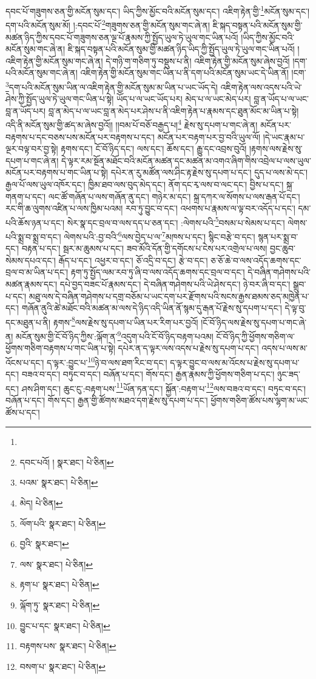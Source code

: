 དབང་པོ་གཟུགས་ཅན་གྱི་མངོན་སུམ་དང་། ཡིད་ཀྱིས་མྱོང་བའི་མངོན་སུམ་དང་། འཇིག་རྟེན་གྱི་\footnote{}མངོན་སུམ་དང་། དག་པའི་མངོན་སུམ་མོ། །:དབང་པོ་\footnote{དབང་པའོ། །  སྣར་ཐང་།  པེ་ཅིན། }གཟུགས་ཅན་གྱི་མངོན་སུམ་གང་ཞེ་ན། ཇི་སྐད་བསྟན་པའི་མངོན་སུམ་གྱི་མཚན་ཉིད་ཀྱིས་དབང་པོ་གཟུགས་ཅན་ལྔ་པོ་རྣམས་ཀྱི་སྤྱོད་ཡུལ་ཏེ་ཡུལ་གང་ཡིན་པའོ། །ཡིད་ཀྱིས་མྱོང་བའི་མངོན་སུམ་གང་ཞེ་ན། ཇི་སྐད་བསྟན་པའི་མངོན་སུམ་གྱི་མཚན་ཉིད་ཡིད་ཀྱི་སྤྱོད་ཡུལ་ཏེ་ཡུལ་གང་ཡིན་པའོ། །འཇིག་རྟེན་གྱི་མངོན་སུམ་གང་ཞེ་ན། དེ་གཉི་ག་གཅིག་ཏུ་བསྡུས་པ་ནི། འཇིག་རྟེན་གྱི་མངོན་སུམ་ཞེས་བྱའོ། །དག་པའི་མངོན་སུམ་གང་ཞེ་ན། འཇིག་རྟེན་གྱི་མངོན་སུམ་གང་ཡིན་པ་ནི་དག་པའི་མངོན་སུམ་ཡང་དེ་ཡིན་ནོ། །ངག་\footnote{པའམ་  སྣར་ཐང་།  པེ་ཅིན། }དག་པའི་མངོན་སུམ་ཡིན་ལ་འཇིག་རྟེན་གྱི་མངོན་སུམ་མ་ཡིན་པ་ཡང་ཡོད་དེ། འཇིག་རྟེན་ལས་འདས་པའི་ཡེ་ཤེས་ཀྱི་སྤྱོད་ཡུལ་ཏེ་ཡུལ་གང་ཡིན་པ་སྟེ། ཡོད་པ་ལ་ཡང་ཡོད་པར། མེད་པ་ལ་ཡང་མེད་པར། བླ་ན་ཡོད་པ་ལ་ཡང་བླ་ན་ཡོད་པར། བླ་ན་མེད་པ་ལ་ཡང་བླ་ན་མེད་པར་ཤེས་པ་ནི་འཇིག་རྟེན་པ་རྣམས་དང་ཐུན་མོང་མ་ཡིན་པ་སྟེ། འདི་ནི་མངོན་སུམ་གྱི་ཚད་མ་ཞེས་བྱའོ།། །།བམ་པོ་བཅོ་བརྒྱད་པ།\footnote{མེད།  པེ་ཅིན། } རྗེས་སུ་དཔག་པ་གང་ཞེ་ན། མངོན་པར་བརྟགས་པ་དང་བཅས་པས་མངོན་པར་བརྟགས་པ་དང་། མངོན་པར་བརྟག་པར་བྱ་བའི་ཡུལ་ལོ། །དེ་ཡང་རྣམ་པ་ལྔར་བལྟ་བར་བྱ་སྟེ། རྟགས་དང་། ངོ་བོ་ཉིད་དང་། ལས་དང་། ཆོས་དང་། རྒྱུ་དང་འབྲས་བུའོ། །རྟགས་ལས་རྗེས་སུ་དཔག་པ་གང་ཞེ་ན། དེ་ལྟར་རམ་སྔོན་མཐོང་བའི་མངོན་མཚན་དང་མཚན་མ་འགའ་ཞིག་གིས་འབྲེལ་པ་ལས་ཡུལ་མངོན་པར་བརྟགས་པ་གང་ཡིན་པ་སྟེ། དཔེར་ན་རུ་མཚོན་ལས་ཤིང་རྟ་རྗེས་སུ་དཔག་པ་དང་། དུད་པ་ལས་མེ་དང་། རྒྱལ་པོ་ལས་ཡུལ་འཁོར་དང་། ཁྱིམ་ཐབ་ལས་བུད་མེད་དང་། ནོག་དང་རྭ་ལས་བ་ལང་དང་། བྱིས་པ་དང་། སྐྲ་གནག་པ་དང་། ལང་ཚོ་གཞོན་པ་ལས་གཞོན་ནུ་དང་། གཉེར་མ་དང་། སྐྲ་དཀར་ལ་སོགས་པ་ལས་རྒན་པོ་དང་། རང་གི་ཆ་ལུགས་འཛིན་པ་ལས་ཁྱིམ་པའམ། རབ་ཏུ་བྱུང་བ་དང་། འཕགས་པ་རྣམས་ལ་ལྟ་བར་འདོད་པ་དང་། དམ་པའི་ཆོས་ཉན་པ་དང་། སེར་སྣ་དང་བྲལ་བ་ལས་དད་པ་ཅན་དང་། :ལེགས་པའི་\footnote{ལོག་པའི་  སྣར་ཐང་།  པེ་ཅིན། }བསམ་པ་སེམས་པ་དང་། ལེགས་པའི་སྨྲ་བ་སྨྲ་བ་དང་། ལེགས་པའི་:བྱ་བའི་\footnote{བྱའི་  སྣར་ཐང་། }ལས་བྱེད་པ་ལ་\footnote{ལས་  སྣར་ཐང་།  པེ་ཅིན། }མཁས་པ་དང་། སྙིང་བརྩེ་བ་དང་། སྙན་པར་སྨྲ་བ་དང་། བརྟན་པ་དང་། སྦར་མ་ཆུམས་པ་དང་། ཟབ་མོའི་དོན་གྱི་དགོངས་པ་ངེས་པར་འགྲེལ་པ་ལས། བྱང་ཆུབ་སེམས་དཔའ་དང་། རྒོད་པ་དང་། འཕྱར་བ་དང་། ཅོ་འདྲི་བ་དང་། རྩེ་བ་དང་། ཅ་ཅོ་ཆེ་བ་ལས་འདོད་ཆགས་དང་བྲལ་བ་མ་ཡིན་པ་དང་། རྟག་ཏུ་སྤྱོད་ལམ་རབ་ཏུ་ཞི་བ་ལས་འདོད་ཆགས་དང་བྲལ་བ་དང་། དེ་བཞིན་གཤེགས་པའི་མཚན་རྣམས་དང་། དཔེ་བྱད་བཟང་པོ་རྣམས་དང་། དེ་བཞིན་གཤེགས་པའི་ཡེ་ཤེས་དང་། ཉེ་བར་ཞི་བ་དང་། སྒྲུབ་པ་དང་། མཐུ་ལས་དེ་བཞིན་གཤེགས་པ་དགྲ་བཅོམ་པ་ཡང་དག་པར་རྫོགས་པའི་སངས་རྒྱས་ཐམས་ཅད་མཁྱེན་པ་དང་། གཞོན་ནུའི་ཚེ་མཐོང་བའི་མཚན་མ་ལས་དེ་ཉིད་འདི་ཡིན་ནོ་སྙམ་དུ་རྒན་པོ་རྗེས་སུ་དཔག་པ་དང་། དེ་ལྟ་བུ་དང་མཐུན་པ་ནི། རྟགས་\footnote{རྟག་པ་  སྣར་ཐང་།  པེ་ཅིན། }ལས་རྗེས་སུ་དཔག་པ་ཡིན་པར་རིག་པར་བྱའོ། །ངོ་བོ་ཉིད་ལས་རྗེས་སུ་དཔག་པ་གང་ཞེ་ན། མངོན་སུམ་གྱི་ངོ་བོ་ཉིད་ཀྱིས་:ལྐོག་ན་\footnote{ལྐོག་ཏུ་  སྣར་ཐང་།  པེ་ཅིན། }འདུག་པའི་ངོ་བོ་ཉིད་བརྟག་པའམ། ངོ་བོ་ཉིད་ཀྱི་ཕྱོགས་གཅིག་ལ་ཕྱོགས་གཅིག་བརྟགས་པ་གང་ཡིན་པ་སྟེ། དཔེར་ན་ད་ལྟར་ལས་འདས་པ་རྗེས་སུ་དཔག་པ་དང་། འདས་པ་ལས་མ་འོངས་པ་དང་། ད་ལྟར་:བྱུང་པ་\footnote{བྱུང་པ་དང་  སྣར་ཐང་།  པེ་ཅིན། }ཉེ་བ་ལས་ཐག་རིང་བ་དང་། ད་ལྟར་བྱུང་བ་ལས་མ་འོངས་པ་རྗེས་སུ་དཔག་པ་དང་། བཟའ་བ་དང་། བཏུང་བ་དང་། བཞོན་པ་དང་། གོས་དང་། རྒྱན་རྣམས་ཀྱི་ཕྱོགས་གཅིག་པ་དང་། ཉུང་ཟད་དང་། ཤས་ཤིག་དང་། ཆུང་ངུ་:བརྟག་པས་\footnote{བརྟགས་པས་  སྣར་ཐང་།  པེ་ཅིན། }ཡོན་ཏན་དང་། སྐྱོན་:བརྟག་པ་\footnote{བསག་པ་  སྣར་ཐང་།  པེ་ཅིན། }ལས་བཟའ་བ་དང་། བཏུང་བ་དང་། བཞོན་པ་དང་། གོས་དང་། རྒྱན་གྱི་ཚོགས་མཐའ་དག་རྗེས་སུ་དཔག་པ་དང་། ཕྱོགས་གཅིག་ཚོས་པས་ལྷག་མ་ཡང་ཚོས་པ་དང་། 